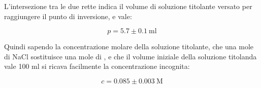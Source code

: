 L'intersezione tra le due rette indica il volume di soluzione titolante versato per raggiungere
il punto di inversione, e vale:

\begin{equation*}
    p = 5.7 \pm 0.1 ~ \si{\milli\litre}
\end{equation*}

Quindi sapendo la concentrazione molare della soluzione titolante, che una mole di NaCl sostituisce una mole di ,
e che il volume iniziale della soluzione titolanda vale 100 ml si ricava facilmente la concentrazione incognita:

\begin{equation*}
    c = 0.085 \pm 0.003 ~ \text{M}
\end{equation*}

